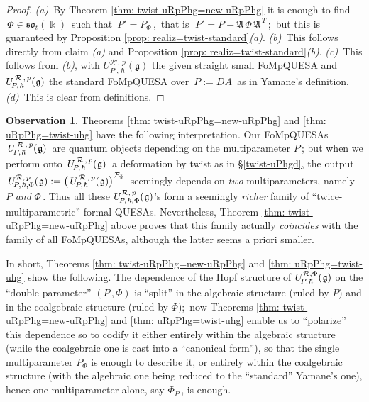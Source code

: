 \documentclass[12pt,reqno,twoside,a4paper]{amsart}
\numberwithin{equation}{section}
\theoremstyle{definition}
\newtheorem{free text}[lema]{}
\newtheorem{obs}[lema]{Observation}
\theoremstyle{remark}
\newcommand{\R}{{\mathcal R}}
\newcommand{\F}{{\mathcal F}}
\def \Dpicc {{\scriptscriptstyle D}}
\def \Ppicc {{\scriptscriptstyle P}}
\def \lieg{\mathfrak{g}}
\def \lieso{\mathfrak{so}}
\def \uRpPhg{U^{\,\R\,,\,p}_{\!P,\hskip0,7pt\hbar}(\hskip0,5pt\lieg)}
\def \pf{\begin{proof}}
\def \epf{\end{proof}}
\theoremstyle{plain}
\begin{document}
\pf
%
 \textit{(a)}\,  By  Theorem \ref{thm: twist-uRpPhg=new-uRpPhg}
 it is enough to find  $ \, \Phi \in \lieso_t(\Bbbk)  \, $  such that
 $ \, P' = P_{\scriptscriptstyle \Phi} \, $,  \,that is
 $ \; P' = P - \mathfrak{A} \, \Phi \, \mathfrak{A}^{\,\scriptscriptstyle T} \, $;
 \,but this is guaranteed by Proposition \ref{prop: realiz=twist-standard}\textit{(a)}.
%
 \vskip5pt
%
   \textit{(b)}\,  This follows directly from claim  \textit{(a)\/}
   and  Proposition \ref{prop: realiz=twist-standard}\textit{(b)}.
%
 \vskip5pt
%
   \textit{(c)}\,  This follows from  \textit{(b)},  with
   $ U_{\!P'\!,\,\hbar}^{\R'\!,\,p}(\lieg) $  the given straight small FoMpQUESA and
   $ \uRpPhg $  the standard FoMpQUESA
%
%
 over  $ \, P := DA \, $
%
 as in Yamane's definition.
%
 \vskip5pt
%
   \textit{(d)}\,  This is clear from definitions.
%
\epf

\vskip9pt

\begin{obs}  \label{obs: parameter_(P,Phi)}
%
 Theorems \ref{thm: twist-uRpPhg=new-uRpPhg}  and  \ref{thm: uRpPhg=twist-uhg}
 have the following interpretation.  Our FoMpQUESAs  $ \, \uRpPhg \, $
 are quantum objects depending on the multiparameter  $ P \, $;
 but when we perform onto  $ \, \uRpPhg \, $  a deformation by twist as
 in  \S \ref{twist-uPhgd},  the output
 $ \, {U_{\!P,\hskip0,7pt\hbar,\Phi}^{\R,\,p}(\hskip0,5pt\lieg)}
 := {\big(\, \uRpPhg \big)}^{\F_\Phi} \, $
 seemingly depends on  \textsl{two\/}  multiparameters, namely  $ P $
 \textsl{and\/}  $ \Phi \, $.  Thus all these
 $ {U_{\!P,\hskip0,7pt\hbar,\Phi}^{\R,\,p}(\hskip0,5pt\lieg)} $'s form a seemingly
 \textsl{richer\/}  family of ``twice-multiparametric'' formal QUESAs.
 Nevertheless,  Theorem \ref{thm: twist-uRpPhg=new-uRpPhg}  above proves
 that this family actually  \textsl{coincides\/}  with the family of all FoMpQUESAs,
 although the latter seems a priori smaller.
                                                              \par
   In short,  Theorems \ref{thm: twist-uRpPhg=new-uRpPhg}  and  \ref{thm: uRpPhg=twist-uhg}
   show the following.  The dependence of the Hopf structure of
   $ {U_{\!P,\hskip0,7pt\hbar}^{\R,\Phi}(\hskip0,5pt\lieg)} $  on the
   ``double parameter''  $ (P\,,\Phi) $  is ``split'' in the algebraic structure
   (ruled by  $ P $)  and in the coalgebraic structure  (ruled by  $ \Phi $);
   \,now  Theorems \ref{thm: twist-uRpPhg=new-uRpPhg}  and  \ref{thm: uRpPhg=twist-uhg}
   enable us to ``polarize'' this dependence so to codify it either entirely
   within the algebraic structure (while the coalgebraic one is cast into a ``canonical form''),
   so that the single multiparameter  $ P_\Phi $  is enough to describe it,
   or entirely within the coalgebraic structure (with the algebraic one being
   reduced to the ``standard'' Yamane's one), hence one multiparameter alone, say  $ \Phi_P \, $,
   is enough.
%
\end{obs}
\end{document}
